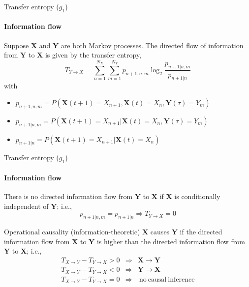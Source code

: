 \documentclass{beamer}
\begin{document}
\begin{frame}{Transfer entropy ($g_1$)}
\framesubtitle{Information flow}

Suppose $\mathbf{X}$ and $\mathbf{Y}$ are both Markov processes.
The directed flow of information from $\mathbf{Y}$ to $\mathbf{X}$ is given by the transfer entropy,
\begin{equation*}
T_{Y\rightarrow X} = \sum_{n=1}^{N_X} \sum_{m=1}^{N_Y} p_{n+1,n,m}\log_2 \frac{p_{n+1|n,m}}{p_{n+1|n}}
\end{equation*}
with 
\begin{itemize}
\item $p_{n+1,n,m} = P(\mathbf{X}(t+1)=X_{n+1},\mathbf{X}(t)=X_n,\mathbf{Y}(\tau)=Y_m)$
\item $p_{n+1|n,m} = P(\mathbf{X}(t+1)=X_{n+1}|\mathbf{X}(t)=X_n,\mathbf{Y}(\tau)=Y_m)$ 
\item $p_{n+1|n} = P(\mathbf{X}(t+1)=X_{n+1}|\mathbf{X}(t)=X_n)$
\end{itemize}
\end{frame}

\begin{frame}{Transfer entropy ($g_1$)}
\framesubtitle{Information flow}

There is no directed information flow from $\mathbf{Y}$ to $\mathbf{X}$ if $\mathbf{X}$ is conditionally independent of $\mathbf{Y}$; i.e.,\\
\begin{equation*}
p_{n+1|n,m}= p_{n+1|n} \Rightarrow T_{Y\rightarrow X} = 0
\end{equation*}
\pause
\begin{block}{Operational causality (information-theoretic)}
$\mathbf{X}$ causes $\mathbf{Y}$ if the directed information flow from $\mathbf{X}$ to $\mathbf{Y}$ is higher than the directed information flow from $\mathbf{Y}$ to $\mathbf{X}$; i.e.,
\begin{eqnarray*}
T_{X\rightarrow Y}-T_{Y\rightarrow X}>0&\Rightarrow& \mathbf{X}\rightarrow\mathbf{Y}\\
T_{X\rightarrow Y}-T_{Y\rightarrow X}<0&\Rightarrow& \mathbf{Y}\rightarrow\mathbf{X}\\
T_{X\rightarrow Y}-T_{Y\rightarrow X}=0&\Rightarrow& \mathrm{\ no\ causal\ inference}\\
\end{eqnarray*}
\end{block}
\end{frame}
\end{document}
